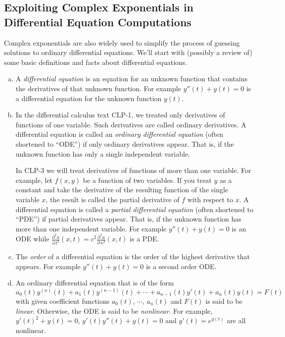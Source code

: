 \subsection{Exploiting Complex Exponentials in Differential Equation Computations}       \label{ssec complex de}
 
Complex exponentials are also widely used to simplify the process
of guessing solutions to ordinary differential equations. We'll start with
(possibly a review of) some basic definitions and facts about
differential equations.

\begin{defn}\label{def:apODE}
\begin{enumerate}[(a)]
\item %
A \emph{differential equation} is an equation for an
unknown function that contains the derivatives of that unknown function.
For example $y''(t)+y(t)=0$ is a differential equation for the unknown 
function $y(t)$.

\item %
In the differential calculus text CLP-1, we treated only derivatives of functions of one variable. Such derivatives are called ordinary derivatives. 
A differential equation is called an \emph{ordinary differential
equation} (often shortened to ``ODE'') if only ordinary derivatives 
appear. That is, if the unknown function has only a single independent
variable. 

In CLP-3 we will treat derivatives of functions of more than one variable.
For example, let $f(x,y)$ be a function of two variables. If you treat $y$ as a constant and take the derivative of the resulting function of the single variable $x$, the result is called the partial derivative of $f$ with 
respect to $x$. A differential equation is called a \emph{partial differential
equation} (often shortened to ``PDE'') if partial derivatives
appear. That is, if the unknown function has more than one independent
variable. For example $y''(t)+y(t)=0$ is an ODE while
$\frac{\partial^2 u}{\partial\, t^2}(x,t)=c^2 
\frac{\partial^2 u}{\partial\, x^2}(x,t)$ is a PDE.

\item %
The \emph{order} of a differential equation is the order of the
highest derivative that appears. For example $y''(t)+y(t)=0$ 
is a second order ODE.

\item %
An ordinary differential equation that is of the form
\begin{equation}\label{eqn:ODEordern}
a_0(t) y^{(n)}(t) + a_1(t) y^{(n-1)}(t)+\cdots+a_{n-1}(t) y'(t) +a_n(t)y(t)
=F(t)
\end{equation}
with given coefficient functions $a_0(t)$, $\cdots$, $a_n(t)$ and $F(t)$ 
is said to be \emph{linear}. Otherwise, the ODE is said to be \emph{nonlinear}.
For example, $y'(t)^2+y(t)=0$, $y'(t)y''(t)+y(t)=0$ and $y'(t)=e^{y(t)}$
are all nonlinear.


\end{enumerate}
\end{defn}
